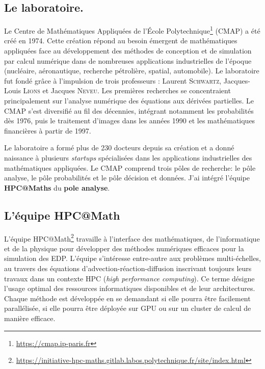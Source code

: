 \subsection{Le laboratoire.}
Le Centre de Mathématiques Appliquées de l'École Polytechnique\footnote{\href{https://cmap.ip-paris.fr}{https://cmap.ip-paris.fr}} (CMAP) a été créé en 1974.
Cette création répond au besoin émergent de mathématiques appliquées face au développement des méthodes de conception et de simulation par calcul numérique dans de nombreuses applications industrielles de l'époque (nucléaire, aéronautique, recherche pétrolière, spatial, automobile).
Le laboratoire fut fondé grâce à l'impulsion de trois professeurs : Laurent \textsc{Schwartz}, Jacques-Louis \textsc{Lions} et Jacques \textsc{Neveu}.
Les premières recherches se concentraient principalement sur l'analyse numérique des équations aux dérivées partielles.
Le CMAP s'est diversifié au fil des décennies, intégrant notamment les probabilités dès 1976, puis le traitement d'images dans les années 1990 et les mathématiques financières à partir de 1997. 

Le laboratoire a formé plus de 230 docteurs depuis sa création et a donné naissance à plusieurs \textit{startups} spécialisées dans les applications industrielles des mathématiques appliquées.
Le CMAP comprend trois pôles  de recherche: le pôle analyse, le pôle probabilités et le pôle décision et données.
J'ai intégré l'équipe \textbf{HPC@Maths} du \textbf{pole analyse}.
\subsection{L'équipe HPC@Math}
    L'équipe HPC@Math\footnote{\href{https://initiative-hpc-maths.gitlab.labos.polytechnique.fr/site/index.html}{https://initiative-hpc-maths.gitlab.labos.polytechnique.fr/site/index.html}} 
    travaille à l'interface des mathématiques, de l'informatique et de la physique pour développer 
    des méthodes numériques efficaces pour la simulation des EDP. 
    L'équipe s'intéresse entre-autre aux problèmes multi-échelles, au travers des équations d'advection-réaction-diffusion
    inscrivant toujours leurs travaux dans un contexte HPC (\emph{high performance computing}).
    Ce terme désigne l'usage optimal des ressources informatiques disponibles et de leur architectures. 
    Chaque méthode est développée en se demandant si elle pourra être facilement parallélisée, si elle pourra être déployée sur GPU ou sur un cluster de calcul de manière efficace. 